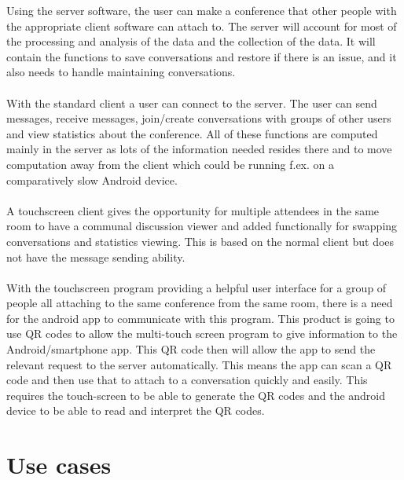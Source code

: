 \documentclass[12p, a4paper, onecolumn]{report}
\begin{document}
Using the server software, the user can make a conference that other people with the appropriate client software can attach to. The server will account for most of the processing and analysis of the data and the collection of the data. It will contain the functions to save conversations and restore if there is an issue, and it also needs to handle maintaining conversations. \\ \\
With the standard client a user can connect to the server. The user can send messages, receive messages, join/create conversations with groups of other users and view statistics about the conference. All of these functions are computed mainly in the server as lots of the information needed resides there and to move computation away from the client which could be running f.ex. on a comparatively slow Android device. \\ \\
A touchscreen client gives the opportunity for multiple attendees in the same room to have a communal discussion viewer and added functionally for swapping conversations and statistics viewing. This is based on the normal client but does not have the message sending ability. \\ \\
With the touchscreen program providing a helpful user interface for a group of people all attaching to the same conference from the same room, there is a need for the android app to communicate with this program. This product is going to use QR codes to allow the multi-touch screen program to give information to the Android/smartphone app. This QR code then will allow the app to send the relevant request to the server automatically. This means the app can scan a QR code and then use that to attach to a conversation quickly and easily. This requires the touch-screen to be able to generate the QR codes and the android device to be able to read and interpret the QR codes.  

\section{Use cases}
\end{document}
